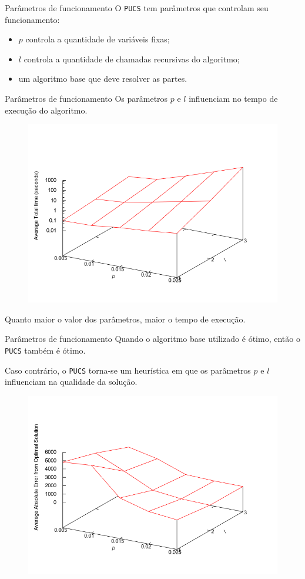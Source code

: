 \documentclass{beamer}
\newcommand{\algname}[1]{\texttt{#1}}
\begin{document}
\begin{frame}{Parâmetros de funcionamento}
    O \algname{PUCS} tem parâmetros que controlam seu funcionamento:
    \pause
    \begin{itemize}
        \item{\alert{$p$} controla a quantidade de variáveis fixas;} \pause
        \item{\alert{$l$} controla a quantidade de chamadas recursivas do algoritmo;} \pause
        \item{um \alert{algoritmo base} que deve resolver as partes.}
    \end{itemize}
\end{frame}

\begin{frame}{Parâmetros de funcionamento}
    Os parâmetros $p$ e $l$ influenciam no tempo de execução do 
    algoritmo.
    \pause
    \begin{figure}
        \includegraphics[clip=true, width=.6\textwidth]{pucs/parameters/n200-20-3_time.png}
    \end{figure}
    Quanto maior o valor dos parâmetros, maior o tempo de execução.
\end{frame}

\begin{frame}{Parâmetros de funcionamento}
    Quando o algoritmo base utilizado é ótimo, então o \algname{PUCS}
    também é ótimo.
    \vspace{1em}\pause

    Caso contrário, o \algname{PUCS} torna-se um heurística em que os
    parâmetros $p$ e $l$ influenciam na qualidade da solução.
    
    \begin{figure}
        \includegraphics[clip=true, width=.6\textwidth]{pucs/parameters/n200-20-3_error.png}
    \end{figure}
\end{frame}
\end{document}
